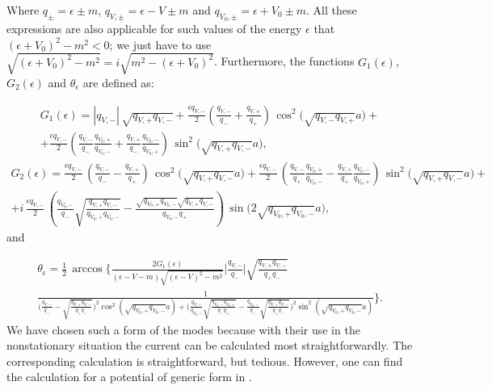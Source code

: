 \documentclass[12pt]{article}
\begin{document}
Where $q_{\pm}=\epsilon\pm m$, $q_{V,\pm}=\epsilon-V\pm m$ and $q_{V_0,\pm}=\epsilon+V_0\pm m$. All these expressions are also applicable for such values of the energy $\epsilon$ that $(\epsilon+V_0)^2-m^2<0$; we just have to use $\sqrt{(\epsilon+V_0)^2-m^2}=i\sqrt{m^2-(\epsilon+V_0)^2}$. Furthermore, the functions $G_1(\epsilon)$, $G_2(\epsilon)$ and $\theta_{\epsilon}$ are defined as:

\begin{gather}
	G_1(\epsilon) = \left|q_{V,-}\right| \, \sqrt{q_{V,+}q_{V,-}} + \frac{\epsilon q_{V,-}}{2}\left(\frac{q_{V,-}}{q_{-}}+\frac{q_{V,+}}{q_{+}}\right) \, \cos^2\Big(\sqrt{q_{V,-}q_{V,+}}a\Big) + \nonumber \\
     + \frac{\epsilon q_{V,-}}{2}\left(\frac{q_{V,-}}{q_{-}}\frac{q_{V_0,+}}{q_{V_0,-}}+\frac{q_{V,+}}{q_{-}}\frac{q_{V_0,-}}{q_{V_0,+}}\right) \, \sin^2\Big(\sqrt{q_{V,+}q_{V,-}}a\Big),
\end{gather}
\begin{gather}
    G_2(\epsilon)=\frac{\epsilon q_{V,-}}{2} \, \left(\frac{q_{V,-}}{q_{-}}-\frac{q_{V,+}}{q_{+}}\right) \, \cos^2\Big(\sqrt{q_{V,+}q_{V,-}}a\Big) + \frac{\epsilon q_{V,-}}{2}\, \left(\frac{q_{V,-}}{q_{+}}\frac{q_{V_0,+}}{q_{V_0,-}}-\frac{q_{V,+}}{q_{+}}\frac{q_{V_0,-}}{q_{V_0,+}}\right) \, \sin^2\Big(\sqrt{q_{V,+}q_{V,-}}a\Big) + \nonumber \\ + i \, \frac{\epsilon q_{V,-}}{2}\, \left(\frac{q_{V_0,-}}{q_{-}}\sqrt{\frac{q_{V,+}q_{V,-}}{q_{V_0,+}q_{V_0,-}}}-\frac{\sqrt{q_{V_0,+}q_{V_0,-}}\sqrt{q_{V,+}q_{V,-}}}{q_{V_0,-}q_{+}}\right) \, \sin\Big(2\sqrt{q_{V_0,+}q_{V_0,-}}a\Big), 
\end{gather}
and

\begin{gather}
\theta_{\epsilon} = \frac{1}{2} \, \arccos\Bigg\{\frac{2G_1(\epsilon)}{(\epsilon-V-m)\sqrt{(\epsilon-V)^2-m^2}}\Big|\frac{q_{V,-}}{q_{-}}\Big|\sqrt{\frac{q_{V,+}q_{V,-}}{q_{+}q_{-}}} \\
\frac{1}{\Big(\frac{q_{V,-}}{q_{-}}-\sqrt{\frac{q_{V,+}q_{V,-}}{q_{+}q_{-}}}\Big)^2\cos^2(\sqrt{q_{V_0,+}q_{V_0,-}}a) + \Big(\frac{q_{V,-}}{q_{V_0,-}}\sqrt{\frac{q_{V_0,-}q_{V_0,+}}{q_{-}q_{+}}}-\frac{q_{V_0,-}}{q_{-}}\sqrt{\frac{q_{V,+}q_{V,-}}{q_{+}q_{-}}}\Big)^2\sin^2(\sqrt{q_{V_0,+}q_{V_0,-}}a)}\Bigg\}.\nonumber 
\end{gather}
We have chosen such a form of the modes because with their use in the nonstationary situation the current can be calculated most straightforwardly. The corresponding calculation is straightforward, but tedious. However, one can find the calculation for a potential of generic form in \cite{Akhmedov:2025jtk}. 
\end{document}
